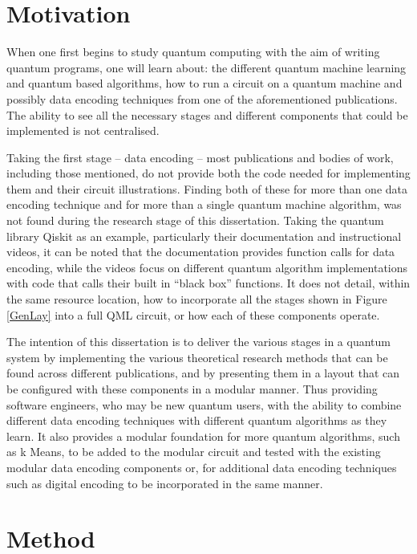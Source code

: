 \section{Motivation}

When one first begins to study quantum computing with the aim of writing quantum programs, one will learn about: the different quantum machine learning and quantum based algorithms, how to run a circuit on a quantum machine and possibly data encoding techniques from one of the aforementioned publications. The ability to see all the necessary stages and different components that could be implemented is not centralised.

Taking the first stage -- data encoding -- most publications and bodies of work, including those mentioned, do not provide both the code needed for implementing them and their circuit illustrations. Finding both of these for more than one data encoding technique and for more than a single quantum machine algorithm, was not found during the research stage of this dissertation. Taking the quantum library Qiskit as an example, particularly their documentation and instructional videos, it can be noted that the documentation provides function calls for data encoding, while the videos focus on different quantum algorithm implementations with code that calls their built in “black box” functions.
It does not detail, within the same resource location, how to incorporate all the stages shown in Figure \ref{GenLay} into a full QML circuit, or how each of these components operate. 

The intention of this dissertation is to deliver the various stages in a quantum system by implementing the various theoretical research methods that can be found across different publications, and by presenting them in a layout that can be configured with these components in a modular manner. Thus providing software engineers, who may be new quantum users, with the ability to combine different data encoding techniques with different quantum algorithms as they learn. It also provides a modular foundation for more quantum algorithms, such as k Means, to be added to the modular circuit and tested with the existing modular data encoding components or, for additional data encoding techniques such as digital encoding to be incorporated in the same manner. 


\section{Method}


